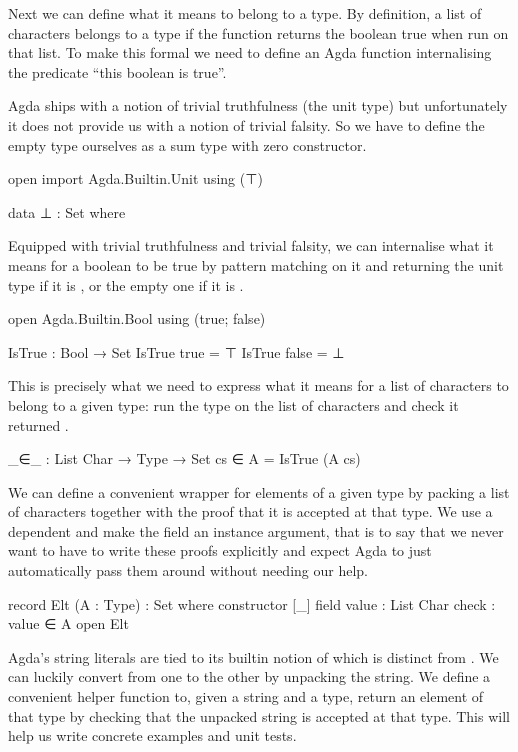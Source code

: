 \documentclass[twocolumn]{article}
\begin{document}
Next we can define what it means to belong to a type. By definition, a
list of characters belongs to a type if the function returns the boolean
true when run on that list. To make this formal we need to define an Agda
function internalising the predicate ``this boolean is true''.

Agda ships with a notion of trivial truthfulness (the unit type) but
unfortunately it does not provide us with a notion of trivial falsity.
So we have to define the empty type ourselves as a sum type with zero
constructor.

\begin{code}
open import Agda.Builtin.Unit using (⊤)

data ⊥ : Set where
\end{code}

Equipped with trivial truthfulness and trivial falsity, we can internalise
what it means for a boolean to be true by pattern matching on it and
returning the unit type if it is , or the empty one if it is
.

\begin{code}
open Agda.Builtin.Bool using (true; false)

IsTrue : Bool → Set
IsTrue true   = ⊤
IsTrue false  = ⊥
\end{code}

This is precisely what we need to express what it means for a list of
characters to belong to a given type: run the type on the
list of characters and check it returned .

\begin{code}
_∈_ : List Char → Type → Set
cs ∈ A = IsTrue (A cs)
\end{code}

We can define a convenient wrapper for elements of a given type by packing
a list of characters together with the proof that it is accepted at that
type. We use a dependent  and make the  field an
instance argument, that is to say that we never want to have to write these
proofs explicitly and expect Agda to just automatically pass them around
without needing our help.

\begin{code}
record Elt (A : Type) : Set where
  constructor [_]
  field value     : List Char
        {{check}} : value ∈ A
open Elt
\end{code}

Agda's string literals are tied to its builtin notion of  which
is distinct from . We can luckily convert from one to the
other by unpacking the string. We define a convenient helper function to,
given a string and a type, return an element of that type by checking that
the unpacked string is accepted at that type. This will help us write
concrete examples and unit tests.
\end{document}
